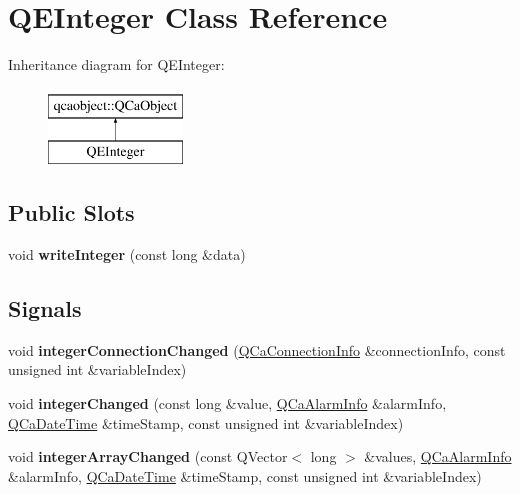 \hypertarget{classQEInteger}{
\section{QEInteger Class Reference}
\label{classQEInteger}
}
Inheritance diagram for QEInteger:\begin{figure}[H]
\begin{center}
\leavevmode
\includegraphics[height=2.000000cm]{classQEInteger}
\end{center}
\end{figure}
\subsection*{Public Slots}
\begin{DoxyCompactItemize}
\item 
\hypertarget{classQEInteger_a12e1e21eb2d00b58b8e954cb4e25a88b}{
void {\bfseries writeInteger} (const long \&data)}
\label{classQEInteger_a12e1e21eb2d00b58b8e954cb4e25a88b}

\end{DoxyCompactItemize}
\subsection*{Signals}
\begin{DoxyCompactItemize}
\item 
\hypertarget{classQEInteger_a9f2801addcd768395f7899a041d12833}{
void {\bfseries integerConnectionChanged} (\hyperlink{classQCaConnectionInfo}{QCaConnectionInfo} \&connectionInfo, const unsigned int \&variableIndex)}
\label{classQEInteger_a9f2801addcd768395f7899a041d12833}

\item 
\hypertarget{classQEInteger_a9e9e1819a17a0a5af3b5cc8dd321d77c}{
void {\bfseries integerChanged} (const long \&value, \hyperlink{classQCaAlarmInfo}{QCaAlarmInfo} \&alarmInfo, \hyperlink{classQCaDateTime}{QCaDateTime} \&timeStamp, const unsigned int \&variableIndex)}
\label{classQEInteger_a9e9e1819a17a0a5af3b5cc8dd321d77c}

\item 
\hypertarget{classQEInteger_a8b38af8bda7231837bee46d244d56d51}{
void {\bfseries integerArrayChanged} (const QVector$<$ long $>$ \&values, \hyperlink{classQCaAlarmInfo}{QCaAlarmInfo} \&alarmInfo, \hyperlink{classQCaDateTime}{QCaDateTime} \&timeStamp, const unsigned int \&variableIndex)}
\label{classQEInteger_a8b38af8bda7231837bee46d244d56d51}

\end{DoxyCompactItemize}
